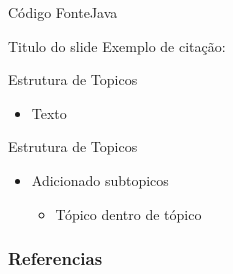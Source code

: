 \documentclass[aspectratio=169]{beamer}
\begin{document}

\begin{frame}{Código Fonte}{Java}
\lstI
\end{frame}

\begin{frame}{Titulo do slide}
    Exemplo de citação: \cite{github}
\end{frame}

    \begin{frame}{Estrutura de Topicos}
        
        \begin{itemize}
            \item Texto %
        \end{itemize}
        
    \end{frame}
    
    \begin{frame}{Estrutura de Topicos}
        
        \begin{itemize}
            \item Adicionado subtopicos
            \begin{itemize}
                \item Tópico dentro de tópico
            \end{itemize}
        \end{itemize}
        
    \end{frame}




\nocite{github}

\begin{frame}[allowframebreaks]
        \frametitle{Referencias}
        
        
        
\end{frame}

\end{document}
